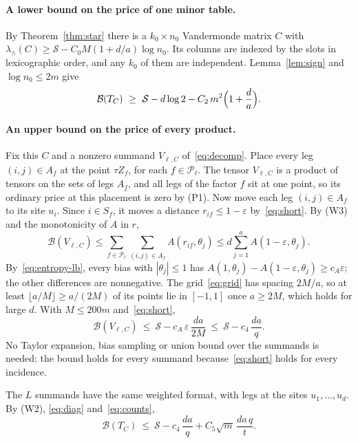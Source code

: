 \documentclass[11pt]{article}
\theoremstyle{remark}
\newcommand{\price}{\mathcal B}
\newcommand{\cP}{\mathcal P}
\newcommand{\cS}{\mathcal S}
\newcommand{\lamext}{\lambda_\wedge}
\begin{document}
\paragraph{A lower bound on the price of one minor table.}
By Theorem~\ref{thm:star} there is a \(k_0\times n_0\) Vandermonde matrix
\(C\) with \(\lamext(C)\ge\cS-C_0M(1+d/a)\log n_0\). Its columns are
indexed by the slots in lexicographic order, and any \(k_0\) of them are
independent. Lemma~\ref{lem:sign} and \(\log n_0\le2m\) give
\begin{equation}\label{eq:lower}
 \price(T_C)\ \ge\ \cS-d\log2-C_2\,m^2\Bigl(1+\frac da\Bigr).
\end{equation}

\paragraph{An upper bound on the price of every product.}
Fix this \(C\) and a nonzero summand \(V_{\ell,C}\)
of~\eqref{eq:decomp}. Place every leg \((i,j)\in A_f\) at the point
\(\tau Z_f\), for each \(f\in\cP_\ell\). The tensor \(V_{\ell,C}\) is a
product of tensors on the sets of legs \(A_f\), and all legs of the
factor \(f\) sit at one point, so its ordinary price at this placement is
zero by (P1). Now move each leg \((i,j)\in A_f\) to its site \(u_i\).
Since \(i\in S_f\), it moves a distance \(r_{if}\le1-\varepsilon\)
by~\eqref{eq:short}. By (W3) and the monotonicity of \(A\) in \(r\),
\[
 \price(V_{\ell,C})\le\sum_{f\in\cP_\ell}\sum_{(i,j)\in A_f}A(r_{if},\theta_j)
  \le d\sum_{j=1}^aA(1-\varepsilon,\theta_j).
\]
By~\eqref{eq:entropy-lb}, every bias with \(|\theta_j|\le1\) has
\(A(1,\theta_j)-A(1-\varepsilon,\theta_j)\ge c_A\varepsilon\); the other
differences are nonnegative. The grid~\eqref{eq:grid} has spacing
\(2M/a\), so at least \(\lfloor a/M\rfloor\ge a/(2M)\) of its points lie
in \([-1,1]\) once \(a\ge2M\), which holds for large \(d\). With
\(M\le200m\) and~\eqref{eq:short},
\begin{equation}\label{eq:product-upper}
 \price(V_{\ell,C})\ \le\ \cS-c_A\,\varepsilon\,\frac{da}{2M}
  \ \le\ \cS-c_4\,\frac{da}{q}.
\end{equation}
No Taylor expansion, bias sampling or union bound over the summands is
needed: the bound holds for every summand because~\eqref{eq:short} holds
for every incidence.

The \(L\) summands have the same weighted format, with legs at the sites
\(u_1,\ldots,u_d\). By (W2), \eqref{eq:diag} and~\eqref{eq:counts},
\begin{equation}\label{eq:upper}
 \price(T_C)\ \le\ \cS-c_4\,\frac{da}{q}+C_5\sqrt m\,\frac{da\,q}{t}.
\end{equation}
\end{document}
